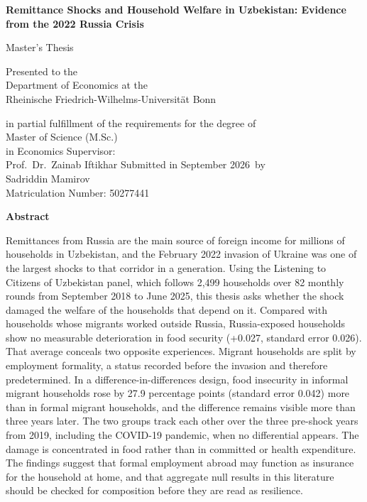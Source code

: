 \documentclass[11pt, a4paper, oneside]{article}
\newcommand{\studentfullname}{Sadriddin Mamirov}
\newcommand{\studentID}{50277441}                 %
\newcommand{\manuscripttitle}{Remittance Shocks and Household Welfare in Uzbekistan: Evidence from the 2022 Russia Crisis}
\newcommand{\submissionmonth}{September 2026}       %
\newcommand{\advisorname}{Prof.~Dr.\ Zainab Iftikhar}
\newlength{\baselinedist}\setlength{\baselinedist}{19.5pt}
\begin{document}
\thispagestyle{empty}
\begin{center}
  \null\vfill
  {\fontsize{22pt}{26pt}\bfseries\manuscripttitle\par}
  \vfill\vfill
  {\LARGE Master's Thesis\par}
  \vspace{1.75\baselinedist}
  Presented to the \\
  Department of Economics at the \\
  Rheinische Friedrich-Wilhelms-Universit\"at Bonn
  \vspace{1.25\baselinedist}

  in partial fulfillment of the requirements for the degree of \\[\baselinedist]
  Master of Science (M.Sc.) \\ in Economics
  \vfill\vfill
  Supervisor: \\ \advisorname
  \vfill\vfill
  Submitted in \submissionmonth\ by \\[1.5\baselinedist]
  {\Large \studentfullname} \\[1.5\baselinedist]
  Matriculation Number: \studentID
  \vfill
\end{center}
\clearpage

\thispagestyle{empty}
\begin{center}{\large\bfseries Abstract}\end{center}
\vspace{\baselinedist}
\noindent
Remittances from Russia are the main source of foreign income for millions of households in Uzbekistan, and the February 2022 invasion of Ukraine was one of the largest shocks to that corridor in a generation. Using the Listening to Citizens of Uzbekistan panel, which follows 2,499 households over 82 monthly rounds from September 2018 to June 2025, this thesis asks whether the shock damaged the welfare of the households that depend on it. Compared with households whose migrants worked outside Russia, Russia-exposed households show no measurable deterioration in food security (+0.027, standard error 0.026). That average conceals two opposite experiences. Migrant households are split by employment formality, a status recorded before the invasion and therefore predetermined. In a difference-in-differences design, food insecurity in informal migrant households rose by 27.9 percentage points (standard error 0.042) more than in formal migrant households, and the difference remains visible more than three years later. The two groups track each other over the three pre-shock years from 2019, including the COVID-19 pandemic, when no differential appears. The damage is concentrated in food rather than in committed or health expenditure. The findings suggest that formal employment abroad may function as insurance for the household at home, and that aggregate null results in this literature should be checked for composition before they are read as resilience.
\clearpage
\end{document}
